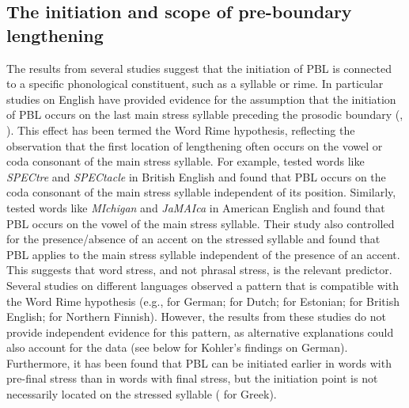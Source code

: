 \documentclass[output=paper]{langscibook}
\begin{document}
\subsection{The initiation and scope of pre-boundary lengthening}\label{initiation}
The results from several studies suggest that the initiation of PBL is connected to a specific phonological constituent, such as a syllable or rime. In particular studies on English have provided evidence for the assumption that the initiation of PBL occurs on the last main stress syllable preceding the prosodic boundary (\citealt{White2002}, \citealt{TurkShattuck-Hufnagel2007}). This effect has been termed the Word Rime hypothesis, reflecting the observation that the first location of lengthening often occurs on the vowel or coda consonant of the main stress syllable. For example, \citet{White2002} tested words like \textit{SPECtre} and \textit{SPECtacle} in British English and found that PBL occurs on the coda consonant of the main stress syllable independent of its position. Similarly, \citet{TurkShattuck-Hufnagel2007} tested words like \textit{MIchigan} and \textit{JaMAIca} in American English and found that PBL occurs on the vowel of the main stress syllable. Their study also controlled for the presence\slash absence of an accent on the stressed syllable and found that PBL applies to the main stress syllable independent of the presence of an accent. This suggests that word stress, and not phrasal stress, is the relevant predictor. Several studies on different languages observed a pattern that is compatible  with the Word Rime hypothesis (e.g., \citealt{Kohler1983} for German; \citealt{Cambier-Langeveld1997} for Dutch; \citealt{Krull1997} for Estonian; \citealt{Cambier-Langeveld2000} for British English; \citealt{NakaiEtal2009} for Northern Finnish). However, the results from these studies do not provide independent evidence for this pattern, as alternative explanations could also account for the data (see below for Kohler's findings on German). Furthermore, it has been found that PBL can be initiated earlier in words with pre-final stress than in words with final stress, but the initiation point is not necessarily located on the stressed syllable (\citealt{Katsika2016} for Greek).
\end{document}
